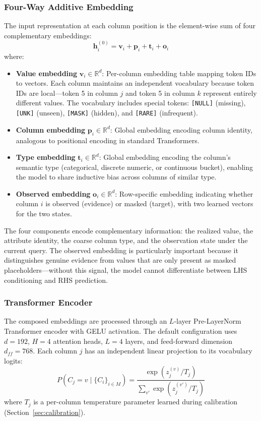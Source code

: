 \documentclass[conference]{IEEEtran}
\begin{document}
\subsubsection{Four-Way Additive Embedding}
The input representation at each column position is the element-wise sum of four complementary embeddings:
\begin{equation}
    \mathbf{h}_i^{(0)} = \mathbf{v}_i + \mathbf{p}_i + \mathbf{t}_i + \mathbf{o}_i
\end{equation}
where:
\begin{itemize}
    \item \textbf{Value embedding} $\mathbf{v}_i \in \mathbb{R}^d$: Per-column embedding table mapping token IDs to vectors. Each column maintains an independent vocabulary because token IDs are local---token 5 in column $j$ and token 5 in column $k$ represent entirely different values. The vocabulary includes special tokens: \texttt{[NULL]} (missing), \texttt{[UNK]} (unseen), \texttt{[MASK]} (hidden), and \texttt{[RARE]} (infrequent).
    \item \textbf{Column embedding} $\mathbf{p}_i \in \mathbb{R}^d$: Global embedding encoding column identity, analogous to positional encoding in standard Transformers.
    \item \textbf{Type embedding} $\mathbf{t}_i \in \mathbb{R}^d$: Global embedding encoding the column's semantic type (categorical, discrete numeric, or continuous bucket), enabling the model to share inductive bias across columns of similar type.
    \item \textbf{Observed embedding} $\mathbf{o}_i \in \mathbb{R}^d$: Row-specific embedding indicating whether column $i$ is observed (evidence) or masked (target), with two learned vectors for the two states.
\end{itemize}

The four components encode complementary information: the realized value, the attribute identity, the coarse column type, and the observation state under the current query. The observed embedding is particularly important because it distinguishes genuine evidence from values that are only present as masked placeholders---without this signal, the model cannot differentiate between LHS conditioning and RHS prediction.

\subsubsection{Transformer Encoder}
The composed embeddings are processed through an $L$-layer Pre-LayerNorm Transformer encoder with GELU activation. The default configuration uses $d = 192$, $H = 4$ attention heads, $L = 4$ layers, and feed-forward dimension $d_{ff} = 768$. Each column $j$ has an independent linear projection to its vocabulary logits:
\begin{equation}
    P(C_j = v \mid \{C_i\}_{i \in M}) = \frac{\exp(z_j^{(v)} / T_j)}{\sum_{v'} \exp(z_j^{(v')} / T_j)}
\end{equation}
where $T_j$ is a per-column temperature parameter learned during calibration (Section~\ref{sec:calibration}).
\end{document}

